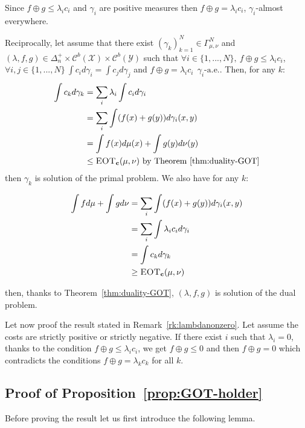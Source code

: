 \begin{prv}
Since $f\oplus g\leq \lambda_ic_i$ and $\gamma_i$ are positive measures then $f\oplus g= \lambda_ic_i$, $\gamma_i$-almost everywhere.


Reciprocally, let assume that there exist $(\gamma_k)_{k=1}^N\in\Gamma^N_{\mu,\nu}$ and $(\lambda,f,g)\in \Delta_n^{+}\times\mathcal{C}^b(\mathcal{X})\times\mathcal{C}^b(\mathcal{Y})$ such that $\forall i\in\{1,...,N\},~ f\oplus g\leq\lambda_i c_i$,  $\forall i,j\in\{1,...,N\}~\int c_i d\gamma_i=\int c_j d\gamma_j$ and $f \oplus g= \lambda_i c_i ~~\gamma_{i}\text{-a.e.}$. Then, for any $k$:
\begin{align*}
\int c_k d\gamma_k &= \sum_i\lambda_i\int c_id\gamma_i\\
&= \sum_i\int(f(x)+g(y))d\gamma_i(x,y)\\
&= \int f(x)d\mu(x)+\int g(y)d\nu(y)\\
&\leq \textsc{EOT}_{\mathbf{c}}(\mu,\nu)\text{ by Theorem~\ref{thm:duality-GOT}}
\end{align*}
then $\gamma_k$ is solution of the primal problem. We also have for any $k$:

\begin{align*}
\int fd\mu +\int gd\nu &= \sum_i\int(f(x)+g(y))d\gamma_i(x,y)\\
&= \sum_i\int\lambda_i c_id\gamma_i\\
&=\int c_k d\gamma_k\\
&\geq \textsc{EOT}_{\mathbf{c}}(\mu,\nu)\\
\end{align*}
\end{prv}
then, thanks to Theorem~\ref{thm:duality-GOT}, $(\lambda,f,g)$ is solution of the dual problem.

Let now proof the result stated in Remark~\ref{rk:lambdanonzero}. Let assume the costs are strictly positive or strictly negative. If there exist $i$ such that $\lambda_i=0$, thanks to the condition $f\oplus g\leq \lambda_i c_i$, we get $f\oplus g\leq0$ and then $f\oplus g=0$ which contradicts the conditions $f\oplus g = \lambda_kc_k$ for all $k$. 




\subsection{Proof of Proposition~\ref{prop:GOT-holder}}
\label{prv:GOT-holder}



Before proving the result let us first introduce the following lemma.

